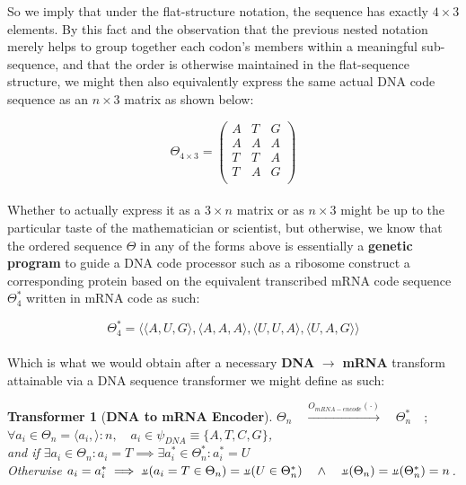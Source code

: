 \documentclass[a4paper, 18pt]{book} %
\newtheorem{transf}{Transformer}
\newcommand{\invpi}{\rotatebox[origin=c]{180}{$\pi$}}
\begin{document}
So we imply that under the flat-structure notation, the sequence has exactly $4 \times 3$ elements. By this fact and the observation that the previous nested notation merely helps to group together each codon's members within a meaningful sub-sequence, and that the order is otherwise maintained in the flat-sequence structure, we might then also equivalently express the same actual DNA code sequence as an $n \times 3$ matrix as shown below:

 \begin{equation}
\label{EQ5a}
\Theta_{4 \times 3} = \begin{pmatrix}
A& T& G\\
A& A& A\\
T& T& A\\
T& A & G \\
\end{pmatrix}
\end{equation}\\


Whether to actually express it as a $3 \times n$ matrix or as $n \times 3$ might be up to the particular taste of the mathematician or scientist, but otherwise, we know that the ordered sequence $\Theta$ in any of the forms above is essentially a \textbf{genetic program} to guide a DNA code processor such as a ribosome construct a corresponding protein based on the equivalent transcribed mRNA code sequence $\Theta_4^*$ written in mRNA code as such:


 \begin{equation}
\label{EQ6}
\Theta_4^* = \langle \langle A, U, G \rangle, \langle A, A, A \rangle, \langle U, U, A \rangle, \langle U, A, G \rangle \rangle
\end{equation}\\

Which is what we would obtain after a necessary \textbf{DNA} $\rightarrow$ \textbf{mRNA} transform attainable via a DNA sequence transformer we might define as such:\\


\begin{transf}[\textbf{DNA to mRNA Encoder}]
\label{TRANSF1}
$\Theta_n \quad \xrightarrow{O_{mRNA-encode}(\cdot)} \quad \Theta^*_n \quad;$\\
$\forall a_i \in \Theta_n = \langle a_i,\rangle:n, \quad a_i \in \psi_{DNA} \equiv \{A, T, C, G\}$,\\
and if $\exists a_i \in \Theta_n : a_i = T \implies \exists a_i^* \in \Theta^*_n: a_i^* = U$\\
Otherwise $a_i = a_i^* \implies \invpi(a_i = T \in \Theta_n) = \invpi(U \in \Theta^*_n) \quad \land \quad \invpi(\Theta_n) = \invpi(\Theta^*_n) = n$.

\end{transf}
\end{document}
